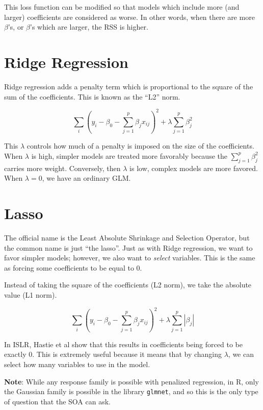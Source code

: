 \documentclass[openany]{book}
\begin{document}
This loss function can be modified so that models which include more (and larger) coefficients are considered as worse. In other words, when there are more \(\beta\)'s, or \(\beta\)'s which are larger, the RSS is higher.

\hypertarget{ridge-regression}{%
\section{Ridge Regression}\label{ridge-regression}}

Ridge regression adds a penalty term which is proportional to the square of the sum of the coefficients. This is known as the ``L2'' norm.

\[
\sum_i(y_i - \beta_0 - \sum_{j = 1}^p\beta_j x_{ij})^2 + \lambda \sum_{j = 1}^p\beta_j^2
\]

This \(\lambda\) controls how much of a penalty is imposed on the size of the coefficients. When \(\lambda\) is high, simpler models are treated more favorably because the \(\sum_{j = 1}^p\beta_j^2\) carries more weight. Conversely, then \(\lambda\) is low, complex models are more favored. When \(\lambda = 0\), we have an ordinary GLM.

\hypertarget{lasso}{%
\section{Lasso}\label{lasso}}

The official name is the Least Absolute Shrinkage and Selection Operator, but the common name is just ``the lasso''. Just as with Ridge regression, we want to favor simpler models; however, we also want to \emph{select} variables. This is the same as forcing some coefficients to be equal to 0.

Instead of taking the square of the coefficients (L2 norm), we take the absolute value (L1 norm).

\[
\sum_i(y_i - \beta_0 - \sum_{j = 1}^p\beta_j x_{ij})^2 + \lambda \sum_{j = 1}^p|\beta_j|
\]

In ISLR, Hastie et al show that this results in coefficients being forced to be exactly 0. This is extremely useful because it means that by changing \(\lambda\), we can select how many variables to use in the model.

\textbf{Note}: While any response family is possible with penalized regression, in R, only the Gaussian family is possible in the library \texttt{glmnet}, and so this is the only type of question that the SOA can ask.
\end{document}
